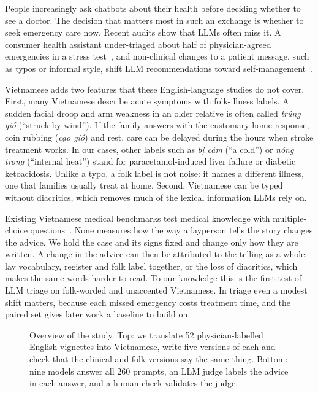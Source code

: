 \documentclass[runningheads]{llncs}
\newcommand{\vi}[1]{\textit{#1}}   %
\begin{document}
People increasingly ask chatbots about their health before deciding whether to see a doctor. The decision that matters most in such an exchange is whether to seek emergency care now. Recent audits show that LLMs often miss it. A consumer health assistant under-triaged about half of physician-agreed emergencies in a stress test~\cite{ramaswamy2026chatgpthealth}, and non-clinical changes to a patient message, such as typos or informal style, shift LLM recommendations toward self-management~\cite{gourabathina2025medium}.

Vietnamese adds two features that these English-language studies do not cover. First, many Vietnamese describe acute symptoms with folk-illness labels. A sudden facial droop and arm weakness in an older relative is often called \vi{trúng gió} (``struck by wind''). If the family answers with the customary home response, coin rubbing (\vi{cạo gió}) and rest, care can be delayed during the hours when stroke treatment works. In our cases, other labels such as \vi{bị cảm} (``a cold'') or \vi{nóng trong} (``internal heat'') stand for paracetamol-induced liver failure or diabetic ketoacidosis. Unlike a typo, a folk label is not noise: it names a different illness, one that families usually treat at home. Second, Vietnamese can be typed without diacritics, which removes much of the lexical information LLMs rely on.

Existing Vietnamese medical benchmarks test medical knowledge with multiple-choice questions~\cite{vm14k}. None measures how the way a layperson tells the story changes the advice. We hold the case and its signs fixed and change only how they are written. A change in the advice can then be attributed to the telling as a whole: lay vocabulary, register and folk label together, or the loss of diacritics, which makes the same words harder to read. To our knowledge this is the first test of LLM triage on folk-worded and unaccented Vietnamese. In triage even a modest shift matters, because each missed emergency costs treatment time, and the paired set gives later work a baseline to build on.

\begin{figure}[t]
\centering

\caption{Overview of the study. Top: we translate 52 physician-labelled English vignettes into Vietnamese, write five versions of each and check that the clinical and folk versions say the same thing. Bottom: nine models answer all 260 prompts, an LLM judge labels the advice in each answer, and a human check validates the judge.}
\label{fig:pipeline}
\end{figure}
\end{document}
